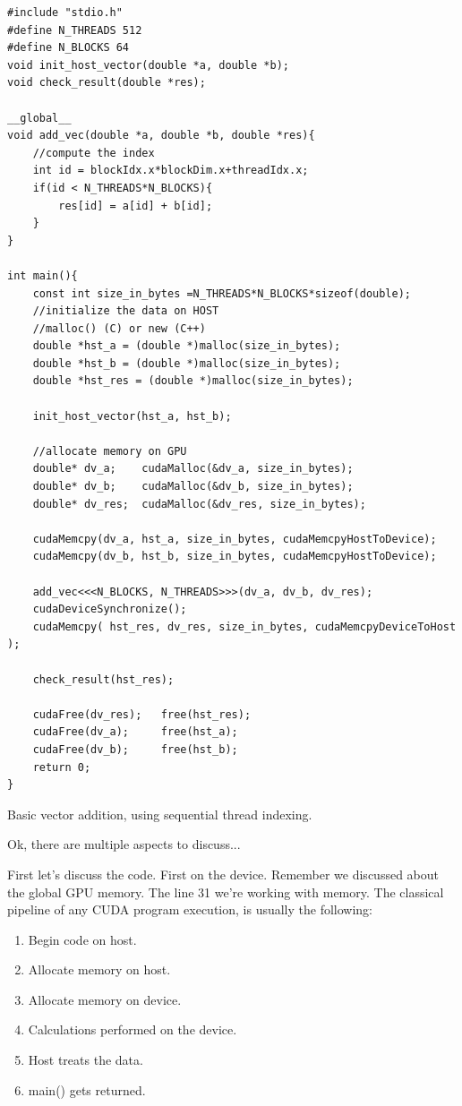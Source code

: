 \begin{listing}
\begin{verbatim}
#include "stdio.h"
#define N_THREADS 512
#define N_BLOCKS 64 
void init_host_vector(double *a, double *b);
void check_result(double *res);

__global__ 
void add_vec(double *a, double *b, double *res){
    //compute the index
    int id = blockIdx.x*blockDim.x+threadIdx.x;
    if(id < N_THREADS*N_BLOCKS){
        res[id] = a[id] + b[id];
    }
}

int main(){
    const int size_in_bytes =N_THREADS*N_BLOCKS*sizeof(double);
    //initialize the data on HOST
    //malloc() (C) or new (C++) 
    double *hst_a = (double *)malloc(size_in_bytes);
    double *hst_b = (double *)malloc(size_in_bytes);
    double *hst_res = (double *)malloc(size_in_bytes);

    init_host_vector(hst_a, hst_b);

    //allocate memory on GPU
    double* dv_a;    cudaMalloc(&dv_a, size_in_bytes);
    double* dv_b;    cudaMalloc(&dv_b, size_in_bytes);
    double* dv_res;  cudaMalloc(&dv_res, size_in_bytes);

    cudaMemcpy(dv_a, hst_a, size_in_bytes, cudaMemcpyHostToDevice);
    cudaMemcpy(dv_b, hst_b, size_in_bytes, cudaMemcpyHostToDevice);

    add_vec<<<N_BLOCKS, N_THREADS>>>(dv_a, dv_b, dv_res);
    cudaDeviceSynchronize();
    cudaMemcpy( hst_res, dv_res, size_in_bytes, cudaMemcpyDeviceToHost );

    check_result(hst_res);

    cudaFree(dv_res);   free(hst_res);
    cudaFree(dv_a);     free(hst_a);  
    cudaFree(dv_b);     free(hst_b);
    return 0;
}
\end{verbatim}
    \caption{Basic vector addition, using sequential thread indexing. \cite{tuomanen2018hands}}
\end{listing}

Ok, there are multiple aspects to discuss...

First let's discuss the code. First on the device. Remember we discussed about the global GPU memory. 
The line 31 we're working with memory. The classical pipeline of any CUDA program
execution, is usually the following:

\begin{enumerate}
\setlength\itemsep{-0.5em}
   \item Begin code on host.
   \item Allocate memory on host.
   \item Allocate memory on device.
   \item Calculations performed on the device.
   \item Host treats the data.
   \item main() gets returned.
\end{enumerate} 

